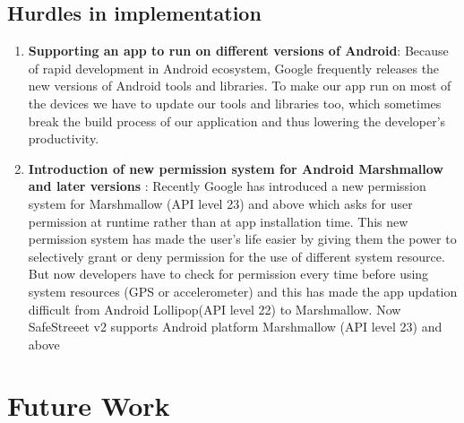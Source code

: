 \documentclass[12pt]{report}
\begin{document}
\section{Hurdles in implementation}
\begin{enumerate}

\item \textbf{Supporting an app to run on different versions of Android}:
  Because of rapid development in Android ecosystem, Google frequently releases
  the new versions of Android tools and libraries. To make our app run on most
  of the devices we have to update our tools and libraries too, which sometimes
  break the build process of our application and thus lowering the developer's
  productivity.
\item \textbf{Introduction of new permission system for Android Marshmallow and
    later versions }: Recently Google has introduced a new permission system for
  Marshmallow (API level 23) and above which asks for user permission at runtime
  rather than at app installation time. This new permission system has made the
  user's life easier by giving them the power to selectively grant or deny
  permission for the use of different system resource. But now developers have
  to check for permission every time before using system resources (GPS or
  accelerometer) and this has made the app updation difficult from Android
  Lollipop(API level 22) to Marshmallow. Now SafeStreeet v2 supports Android
  platform Marshmallow (API level 23) and above
\end{enumerate}
\chapter{Future Work}
\end{document}
